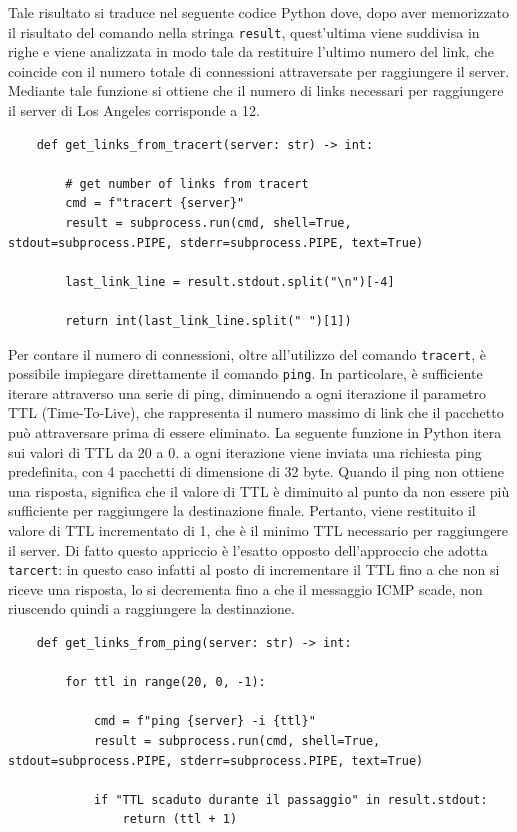 \noindent Tale risultato si traduce nel seguente codice Python dove, dopo aver memorizzato il risultato del comando nella stringa \texttt{result}, quest'ultima viene suddivisa in righe e viene analizzata in modo tale da restituire l'ultimo numero del link, che coincide con il numero totale di connessioni attraversate per raggiungere il server. Mediante tale funzione si ottiene che il numero di links necessari per raggiungere il server di Los Angeles corrisponde a 12.

\begin{lstlisting}
    def get_links_from_tracert(server: str) -> int:

        # get number of links from tracert
        cmd = f"tracert {server}"
        result = subprocess.run(cmd, shell=True, stdout=subprocess.PIPE, stderr=subprocess.PIPE, text=True)

        last_link_line = result.stdout.split("\n")[-4]

        return int(last_link_line.split(" ")[1])
\end{lstlisting}

\noindent Per contare il numero di connessioni, oltre all'utilizzo del comando \texttt{tracert}, è possibile impiegare direttamente il comando \texttt{ping}. In particolare, è sufficiente iterare attraverso una serie di ping, diminuendo a ogni iterazione il parametro TTL (Time-To-Live), che rappresenta il numero massimo di link che il pacchetto può attraversare prima di essere eliminato. La seguente funzione in Python itera sui valori di TTL da 20 a 0. a ogni iterazione viene inviata una richiesta ping predefinita, con 4 pacchetti di dimensione di 32 byte. Quando il ping non ottiene una risposta, significa che il valore di TTL è diminuito al punto da non essere più sufficiente per raggiungere la destinazione finale. Pertanto, viene restituito il valore di TTL incrementato di 1, che è il minimo TTL necessario per raggiungere il server. Di fatto questo appriccio è l'esatto opposto dell'approccio che adotta \texttt{tarcert}: in questo caso infatti al posto di incrementare il TTL fino a che non si riceve una risposta, lo si decrementa fino a che il messaggio ICMP scade, non riuscendo quindi a raggiungere la destinazione.

\begin{lstlisting}
    def get_links_from_ping(server: str) -> int:

        for ttl in range(20, 0, -1):

            cmd = f"ping {server} -i {ttl}"
            result = subprocess.run(cmd, shell=True, stdout=subprocess.PIPE, stderr=subprocess.PIPE, text=True)

            if "TTL scaduto durante il passaggio" in result.stdout:
                return (ttl + 1)
\end{lstlisting}

